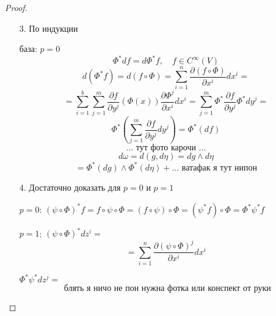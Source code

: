     \begin{proof}
        $ $
        \begin{enumerate}
            \item[3.] По индукции
                \par база: $p=0$
                \[
                    \Phi^* df = d \Phi^* f, \quad f \in C^\infty(V)    
                \]
                \[
                    d(\Phi^* f) = d(f \circ \Phi) = \sum_{i=1}^n \frac{\partial (f \circ \Phi)}{\partial x^i} dx^i = 
                \]
                \[
                    = \sum_{i=1}^b \sum_{j=1}^m \frac{\partial f}{\partial y^j}(\Phi(x)) \frac{\partial \Phi^j}{\partial x^i} dx^i = \sum_{j=1}^m \Phi^* \frac{\partial f}{\partial y^j}\Phi^* dy^j =   
                \]
                \[
                    \Phi^* \left( \sum_{j=1}^m \frac{\partial f}{\partial y^j} dy^j \right) = \Phi^*(df)  
                \]
                \[
                    \text{... тут фото карочи ...}    
                \]
                \[
                    d \omega = d(g, d \eta) = dg \wedge d\eta    
                \]
                \[
                    = \Phi^*(dg) \wedge \Phi^*(d\eta) + \dots \text{ ватафак я тут нипон}    
                \]
            
            \item[4.] Достаточно доказать для $p=0$ и $p=1$
                \par $p=0$: $(\psi \circ \Phi)^* f = f \circ \psi \circ \Phi = (f \circ \psi) \circ \Phi = (\psi^* f) \circ \Phi = \Phi^* \psi^* f$
                \par $p=1$: $(\psi \circ \Phi)^* dz^i = $
                \[
                    = \sum_{i=1}^n \frac{\partial (\psi \circ \Phi)^j}{\partial x^i} dx^i    
                \]
                \par $\Phi^* \psi^* dz^j = $
                \[
                    \text{ блять я ничо не пон нужна фотка или конспект от руки}    
                \]
        \end{enumerate}
    \end{proof}

